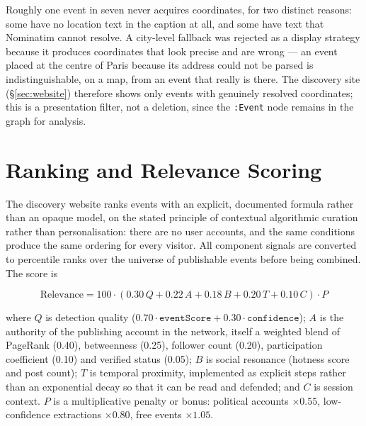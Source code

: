 \documentclass[12pt, a4paper]{report}
\begin{document}
Roughly one event in seven never acquires coordinates, for two distinct
reasons: some have no location text in the caption at all, and some have
text that Nominatim cannot resolve. A city-level fallback was rejected as
a display strategy because it produces coordinates that look precise and
are wrong — an event placed at the centre of Paris because its address
could not be parsed is indistinguishable, on a map, from an event that
really is there. The discovery site (\S\ref{sec:website}) therefore shows
only events with genuinely resolved coordinates; this is a presentation
filter, not a deletion, since the \texttt{:Event} node remains in the
graph for analysis.

\section{Ranking and Relevance Scoring}
\label{sec:ranking}

The discovery website ranks events with an explicit, documented formula
rather than an opaque model, on the stated principle of contextual
algorithmic curation rather than personalisation: there are no user
accounts, and the same conditions produce the same ordering for every
visitor. All component signals are converted to percentile ranks over the
universe of publishable events before being combined. The score is

\[
\text{Relevance} = 100 \cdot \left(0.30\,Q + 0.22\,A + 0.18\,B
+ 0.20\,T + 0.10\,C\right) \cdot P
\]

where $Q$ is detection quality ($0.70 \cdot \texttt{eventScore} + 0.30
\cdot \texttt{confidence}$); $A$ is the authority of the publishing
account in the network, itself a weighted blend of PageRank (0.40),
betweenness (0.25), follower count (0.20), participation coefficient
(0.10) and verified status (0.05); $B$ is social resonance (hotness score
and post count); $T$ is temporal proximity, implemented as explicit
steps rather than an exponential decay so that it can be read and
defended; and $C$ is session context. $P$ is a multiplicative penalty or
bonus: political accounts $\times 0.55$, low-confidence extractions
$\times 0.80$, free events $\times 1.05$.
\end{document}
